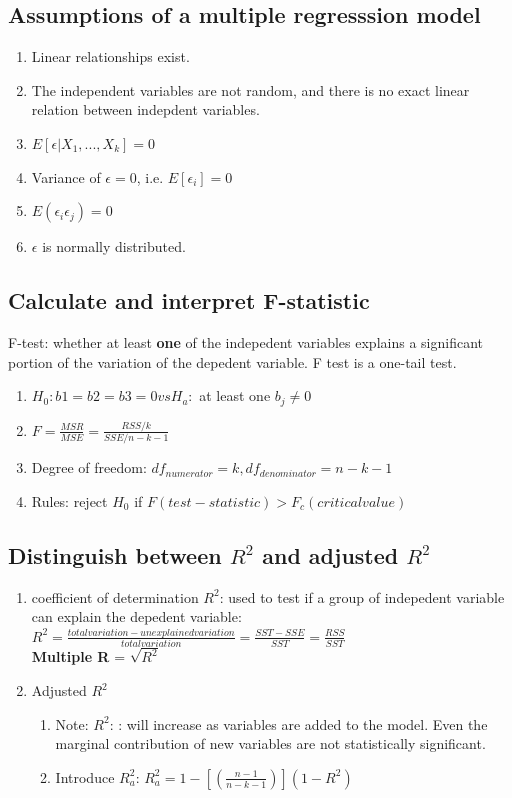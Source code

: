 \documentclass{article}
\begin{document}
\subsection{Assumptions of a multiple regresssion model}
\begin{enumerate}
    \item Linear relationships exist.
    \item The independent variables are not random, and there is no exact linear relation
        between indepdent variables.
    \item $E[\epsilon|X_1,...,X_k]=0$
    \item Variance of $\epsilon=0$, i.e. $E[\epsilon_i]=0$
    \item $E(\epsilon_i\epsilon_j)=0$
    \item $\epsilon$ is normally distributed.
\end{enumerate}
\subsection{Calculate and interpret F-statistic}
F-test: whether at least {\bf one} of the indepedent variables explains a significant
portion of the variation of the depedent variable. F test is a one-tail test.
\begin{enumerate}
    \item $H_0: b1=b2=b3=0 vs H_a:$ at least one $b_j\ne 0$
    \item $F=\frac{MSR}{MSE}=\frac{RSS/k}{SSE/n-k-1}$
    \item Degree of freedom: $df_{numerator}=k, df_{denominator}=n-k-1$
    \item Rules: reject $H_0$ if $F(test-statistic)>F_c(critical value)$
\end{enumerate}
\subsection{Distinguish between $R^2$ and adjusted $R^2$}
\begin{enumerate}
    \item coefficient of determination $R^2$: used to test if a group of indepedent
        variable can explain the depedent variable: 
        \\$R^2=\frac{total variation - unexplained variation}{total variation}
        =\frac{SST-SSE}{SST}=\frac{RSS}{SST}$
        \\{\bf Multiple R} = $\sqrt{R^2}$
    \item Adjusted $R^2$
        \begin{enumerate}
            \item Note: $R^2$: {\color{red}{Overestimating}}: will increase as variables are added to the model.
        Even the marginal contribution of new variables are not statistically significant.
            \item Introduce $R_a^2$: $R_a^2=1-\left[\left(\frac{n-1}{n-k-1}\right)\right](1-R^2)$
        \end{enumerate}
\end{enumerate}
\end{document}
